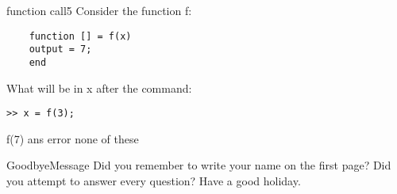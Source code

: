 \documentclass{exam}
\begin{document}
\begin{problem}{function call}{5}
  Consider the function f:
  \begin{verbatim}
    function [] = f(x)
    output = 7;
    end
  \end{verbatim}
  What will be in x after the command:
  \begin{verbatim}>> x = f(3);\end{verbatim}
  \begin{answers}
    \answer f(7)
    \answer ans
     error %
    \answer[fixed] none of these %
  \end{answers}
\end{problem}

\begin{block}{GoodbyeMessage}
  Did you remember to write your name on the first page?  Did you
  attempt to answer every question?    Have a good holiday.
\end{block}
\end{document}
